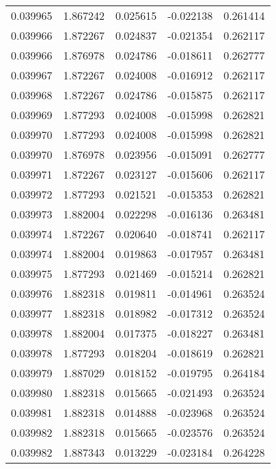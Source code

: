 \begin{tabular}{lrrrr}
0.039965    &  1.867242 &  0.025615 & -0.022138 &             0.261414 \\
0.039966    &  1.872267 &  0.024837 & -0.021354 &             0.262117 \\
0.039966    &  1.876978 &  0.024786 & -0.018611 &             0.262777 \\
0.039967    &  1.872267 &  0.024008 & -0.016912 &             0.262117 \\
0.039968    &  1.872267 &  0.024786 & -0.015875 &             0.262117 \\
0.039969    &  1.877293 &  0.024008 & -0.015998 &             0.262821 \\
0.039970    &  1.877293 &  0.024008 & -0.015998 &             0.262821 \\
0.039970    &  1.876978 &  0.023956 & -0.015091 &             0.262777 \\
0.039971    &  1.872267 &  0.023127 & -0.015606 &             0.262117 \\
0.039972    &  1.877293 &  0.021521 & -0.015353 &             0.262821 \\
0.039973    &  1.882004 &  0.022298 & -0.016136 &             0.263481 \\
0.039974    &  1.872267 &  0.020640 & -0.018741 &             0.262117 \\
0.039974    &  1.882004 &  0.019863 & -0.017957 &             0.263481 \\
0.039975    &  1.877293 &  0.021469 & -0.015214 &             0.262821 \\
0.039976    &  1.882318 &  0.019811 & -0.014961 &             0.263524 \\
0.039977    &  1.882318 &  0.018982 & -0.017312 &             0.263524 \\
0.039978    &  1.882004 &  0.017375 & -0.018227 &             0.263481 \\
0.039978    &  1.877293 &  0.018204 & -0.018619 &             0.262821 \\
0.039979    &  1.887029 &  0.018152 & -0.019795 &             0.264184 \\
0.039980    &  1.882318 &  0.015665 & -0.021493 &             0.263524 \\
0.039981    &  1.882318 &  0.014888 & -0.023968 &             0.263524 \\
0.039982    &  1.882318 &  0.015665 & -0.023576 &             0.263524 \\
0.039982    &  1.887343 &  0.013229 & -0.023184 &             0.264228 \\

\end{tabular}
